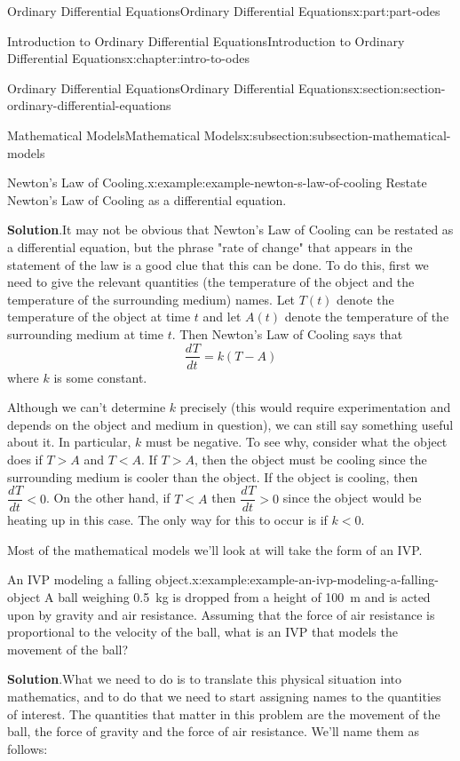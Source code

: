 \documentclass[oneside,10pt,]{book}
\newcommand{\blocktitlefont}{\relax}
\numberwithin{equation}{part}
\newcommand{\dv}[3][]{\dfrac{d^{#1} #2}{d #3^{#1}}}
\newcommand{\lt}{<}
\newcommand{\gt}{>}
\begin{document}
\begin{partptx}{Ordinary Differential Equations}{}{Ordinary Differential Equations}{}{}{x:part:part-odes}
\begin{chapterptx}{Introduction to Ordinary Differential Equations}{}{Introduction to Ordinary Differential Equations}{}{}{x:chapter:intro-to-odes}
\begin{sectionptx}{Ordinary Differential Equations}{}{Ordinary Differential Equations}{}{}{x:section:section-ordinary-differential-equations}
\begin{subsectionptx}{Mathematical Models}{}{Mathematical Models}{}{}{x:subsection:subsection-mathematical-models}
\begin{example}{Newton's Law of Cooling.}{x:example:example-newton-s-law-of-cooling}
Restate Newton's Law of Cooling as a differential equation.%
\par\smallskip%
\noindent\textbf{\blocktitlefont Solution}.\hypertarget{g:solution:idp105548780155168}{}\quad{}It may not be obvious that Newton's Law of Cooling can be restated as a differential equation, but the phrase "rate of change" that appears in the statement of the law is a good clue that this can be done. To do this, first we need to give the relevant quantities (the temperature of the object and the temperature of the surrounding medium) names. Let \(T(t)\) denote the temperature of the object at time \(t\) and let \(A(t)\) denote the temperature of the surrounding medium at time \(t\). Then Newton's Law of Cooling says that%
\begin{equation*}
\dv{T}{t} = k(T-A)
\end{equation*}
where \(k\) is some constant.%
\par
Although we can't determine \(k\) precisely (this would require experimentation and depends on the object and medium in question), we can still say something useful about it. In particular, \(k\) must be negative. To see why, consider what the object does if \(T\gt A\) and \(T\lt A\). If \(T\gt A\), then the object must be cooling since the surrounding medium is cooler than the object. If the object is cooling, then \(\dv{T}{t}\lt0\). On the other hand, if \(T\lt A\) then \(\dv{T}{t}\gt0\) since the object would be heating up in this case. The only way for this to occur is if \(k\lt0\).%
\end{example}
Most of the mathematical models we'll look at will take the form of an IVP.%
\begin{example}{An IVP modeling a falling object.}{x:example:example-an-ivp-modeling-a-falling-object}%
A ball weighing \SI{0.5}{\kilo\gram} is dropped from a height of \SI{100}{\meter} and is acted upon by gravity and air resistance. Assuming that the force of air resistance is proportional to the velocity of the ball, what is an IVP that models the movement of the ball?%
\par\smallskip%
\noindent\textbf{\blocktitlefont Solution}.\hypertarget{g:solution:idp105548780164512}{}\quad{}What we need to do is to translate this physical situation into mathematics, and to do that we need to start assigning names to the quantities of interest. The quantities that matter in this problem are the movement of the ball, the force of gravity and the force of air resistance. We'll name them as follows:%
\begin{align*}

\end{align*}
\end{example}
\end{subsectionptx}
\end{sectionptx}
\end{chapterptx}
\end{partptx}
\end{document}
